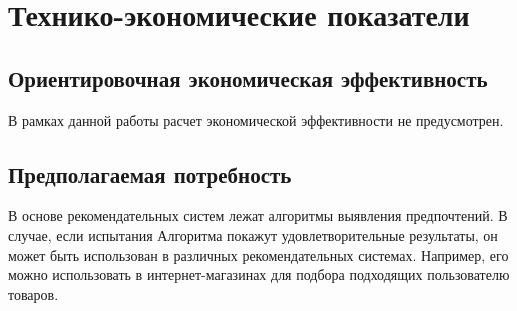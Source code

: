 \chapter*{Технико-экономические показатели}

\section*{Ориентировочная экономическая эффективность}
В рамках данной работы расчет экономической эффективности не предусмотрен.

\section*{Предполагаемая потребность}
В основе рекомендательных систем лежат алгоритмы выявления предпочтений. В случае, если испытания Алгоритма покажут удовлетворительные результаты, он может быть использован в различных рекомендательных системах. Например, его можно использовать в интернет-магазинах для подбора подходящих пользователю товаров.